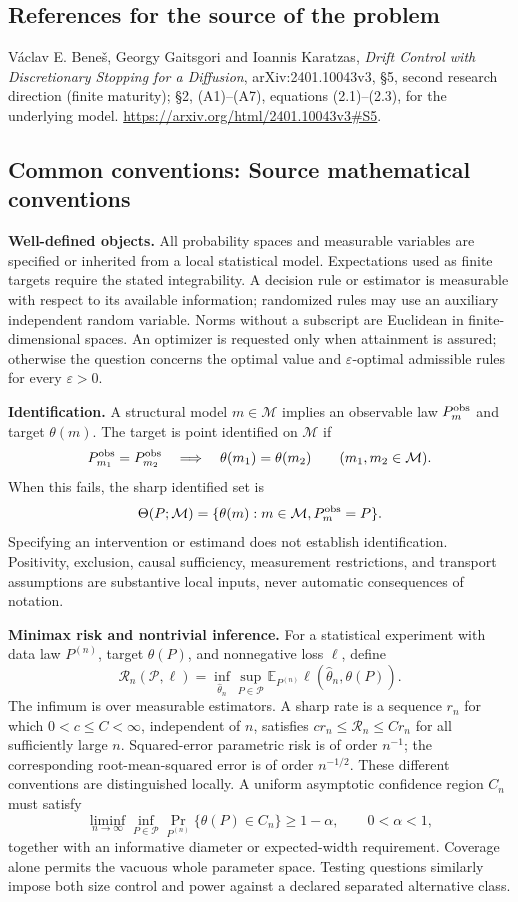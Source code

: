 \documentclass[11pt,a4paper]{article}
\newcommand{\E}{\mathbb E}
\begin{document}
\subsection*{References for the source of the problem}
V\'aclav E. Bene\v{s}, Georgy Gaitsgori and Ioannis Karatzas,
\emph{Drift Control with Discretionary Stopping for a Diffusion},
arXiv:2401.10043v3, \S5, second research direction (finite maturity);
\S2, (A1)--(A7), equations (2.1)--(2.3), for the underlying model.
\url{https://arxiv.org/html/2401.10043v3#S5}.

\subsection*{Common conventions: Source mathematical conventions}

\textbf{Well-defined objects.}
All probability spaces and measurable variables are specified or inherited
from a local statistical model. Expectations used as finite targets require
the stated integrability. A decision rule or estimator is measurable with
respect to its available information; randomized rules may use an auxiliary
independent random variable. Norms without a subscript are Euclidean in
finite-dimensional spaces. An optimizer is requested only when attainment
is assured; otherwise the question concerns the optimal value and
$\varepsilon$-optimal admissible rules for every $\varepsilon>0$.

\textbf{Identification.}
A structural model $m\in\mathcal M$ implies an observable law
$P_m^{\rm obs}$ and target $\theta(m)$. The target is point identified on
$\mathcal M$ if
\[
 P_{m_1}^{\rm obs}=P_{m_2}^{\rm obs}
 \quad\Longrightarrow\quad\theta(m_1)=\theta(m_2)
 \qquad(m_1,m_2\in\mathcal M).
\]
When this fails, the sharp identified set is
\[
 \Theta(P;\mathcal M)=\{\theta(m):m\in\mathcal M,
                                  P_m^{\rm obs}=P\}.
\]
Specifying an intervention or estimand does not establish identification.
Positivity, exclusion, causal sufficiency, measurement restrictions, and
transport assumptions are substantive local inputs, never automatic
consequences of notation.

\textbf{Minimax risk and nontrivial inference.}
For a statistical experiment with data law $P^{(n)}$, target $\theta(P)$,
and nonnegative loss $\ell$, define
\[
 \mathcal R_n(\mathcal P,\ell)
   =\inf_{\widehat\theta_n}\sup_{P\in\mathcal P}
      \E_{P^{(n)}}\ell(\widehat\theta_n,\theta(P)).
\]
The infimum is over measurable estimators. A sharp rate is a sequence
$r_n$ for which $0<c\leq C<\infty$, independent of $n$, satisfies
$c r_n\leq\mathcal R_n\leq C r_n$ for all sufficiently large $n$.
Squared-error parametric risk is of order $n^{-1}$; the corresponding
root-mean-squared error is of order $n^{-1/2}$. These different conventions
are distinguished locally. A uniform asymptotic confidence region $C_n$
must satisfy
\[
 \liminf_{n\to\infty}\inf_{P\in\mathcal P}
     \Pr_{P^{(n)}}\{\theta(P)\in C_n\}\geq 1-\alpha,
 \qquad 0<\alpha<1,
\]
together with an informative diameter or expected-width requirement.
Coverage alone permits the vacuous whole parameter space. Testing questions
similarly impose both size control and power against a declared separated
alternative class.
\end{document}
